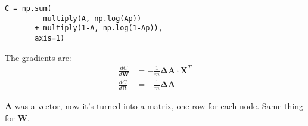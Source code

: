 \begin{center}
\begin{BVerbatim}
C = np.sum(
         multiply(A, np.log(Ap))
       + multiply(1-A, np.log(1-Ap)),
       axis=1)
\end{BVerbatim}
\end{center}

The gradients are: 
\begin{align}
  \frac{dC}{d\mathbf{W}} &= -\frac{1}{m}\mathbf{\Delta A}\cdot{}\mathbf{X}^T\\
  \frac{dC}{d\mathbf{B}} &= -\frac{1}{m}\mathbf{\Delta A}
\end{align}

$\mathbf{A}$ was a vector, now it's turned into a matrix, one row for each node. Same thing for $\mathbf{W}$.

